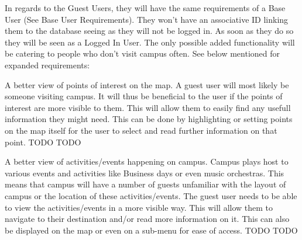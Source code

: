 In regards to the Guest Users, they will have the same requirements of a Base User (See Base User Requirements). They won't have an associative ID linking them to the database seeing as they will not be logged in. As soon as they do so they will be seen as a Logged In User. The only possible added functionality will be catering to people who don't visit campus often. See below mentioned for expanded requirements:

\FuncReq
{A better view of points of interest on the map.}
{A guest user will most likely be someone visiting campus. It will thus be beneficial to the user if the points of interest are more visible to them. This will allow them to easily find any usefull information they might need. This can be done by highlighting or setting points on the map itself for the user to select and read further information on that point.}
{TODO}
{TODO}

\FuncReq
{A better view of activities/events happening on campus.}
{Campus plays host to various events and activities like Business days or even music orchestras. This means that campus will have a number of guests unfamiliar with the layout of campus or the location of these activities/events. The guest user needs to be able to view the activities/events in a more visible way. This will allow them to navigate to their destination and/or read more information on it. This can also be displayed on the map or even on a sub-menu for ease of access.}
{TODO}
{TODO}


